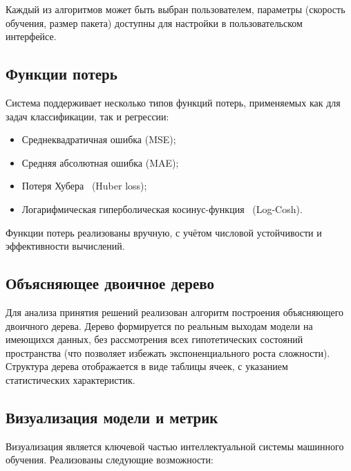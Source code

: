 Каждый из алгоритмов может быть выбран пользователем, параметры (скорость обучения, размер пакета) доступны для настройки в пользовательском интерфейсе.

\subsection{Функции потерь}
Система поддерживает несколько типов функций потерь, применяемых как для задач классификации, так и регрессии:

\begin{itemize}
    \item Среднеквадратичная ошибка (MSE);
    \item Средняя абсолютная ошибка (MAE);
    \item Потеря Хубера~\cite{meyer2021alternative} (Huber loss);
    \item Логарифмическая гиперболическая косинус-функция~\cite{saleh2022statistical} (Log-Cosh).
\end{itemize}

Функции потерь реализованы вручную, с учётом числовой устойчивости и эффективности вычислений.

\subsection{Объясняющее двоичное дерево}
Для анализа принятия решений реализован алгоритм построения объясняющего двоичного дерева. Дерево формируется по реальным выходам модели на имеющихся данных, без рассмотрения всех гипотетических состояний пространства (что позволяет избежать экспоненциального роста сложности). Структура дерева отображается в виде таблицы ячеек, с указанием статистических характеристик.

\subsection{Визуализация модели и метрик}
Визуализация является ключевой частью интеллектуальной системы машинного обучения. Реализованы следующие возможности:

